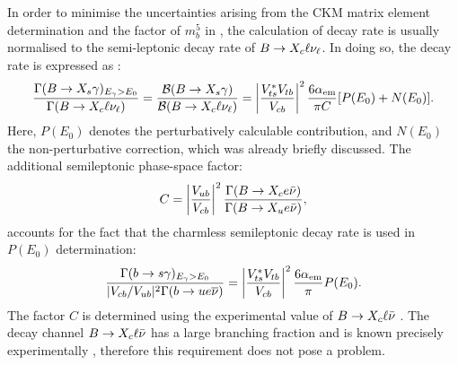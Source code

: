 In order to minimise the uncertainties arising from the CKM matrix element determination and the factor of $m_b^5$ in , the calculation of \BtoXsgamma decay rate is usually normalised to the semi-leptonic decay rate of $B\rightarrow X_c\ell\nu_{\ell}$.
In doing so, the decay rate is expressed as \cite{Misiak:2020vlo}:
\begin{equation}\label{eq:normalised_br}
    \frac{\Gamma({B\rightarrow X_{s} \gamma})_{{E_{\gamma}}>E_0}}{\Gamma(B\rightarrow X_c\ell\nu_\ell)} = \frac{\mathcal{B}({B\rightarrow X_{s} \gamma})}{\mathcal{B}(B\rightarrow X_c\ell\nu_\ell)} = \left|\frac{V_{ts}^*V_{tb}}{V_{cb}}\right|^2\frac{6\alpha_{\mathrm{em}}}{\pi C}[P(E_0)+N(E_0)].
\end{equation}
Here, $P(E_0)$ denotes the perturbatively calculable contribution, and $N(E_0)$ the non-perturbative correction, which was already briefly discussed.
The additional semileptonic phase-space factor:
\begin{equation}
    C = \left|\frac{V_{ub}}{V_{cb}}\right|^2 \frac{\Gamma(B\rightarrow X_ce\bar{\nu})}{\Gamma(B\rightarrow X_ue\bar{\nu})},
\end{equation}  
accounts for the fact that the charmless semileptonic decay rate is used in $P(E_0)$ determination:
\begin{equation}
    \frac{\Gamma(b\rightarrow s\gamma)_{{E_{\gamma}}>E_0}}{|V_{cb}/V_{ub}|^2 \Gamma(b\rightarrow u e\overline{\nu})} = \left|\frac{V_{ts}^*V_{tb}}{V_{cb}}\right|^2 \frac{6\alpha_{\mathrm{em}}}{\pi}P(E_0).
\end{equation}
The factor $C$ is determined using the experimental value of $B\rightarrow X_c \ell\bar{\nu}$ \cite{Alberti:2014yda}.
The decay channel $B\rightarrow X_c \ell\bar{\nu}$ has a large branching fraction and is known precisely experimentally \cite{Workman:2022ynf}, therefore this requirement does not pose a problem.

